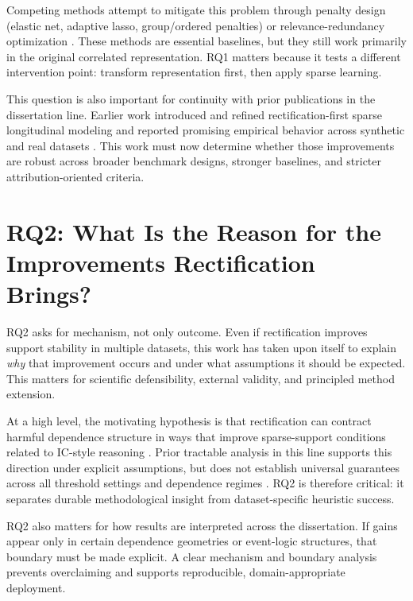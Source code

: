 Competing methods attempt to mitigate this problem through penalty design (elastic net, adaptive lasso, group/ordered penalties) or relevance-redundancy optimization \autocites{HZou2005Regularization,HZou2006adaptive,yuan2006,meier2008,RTibshirani2016ordered,katrutsa2017}. These methods are essential baselines, but they still work primarily in the original correlated representation. RQ1 matters because it tests a different intervention point: transform representation first, then apply sparse learning.

This question is also important for continuity with prior publications in the dissertation line. Earlier work introduced and refined rectification-first sparse longitudinal modeling and reported promising empirical behavior across synthetic and real datasets \autocites{orender2022,JOrender2025Efficient}. This work must now determine whether those improvements are robust across broader benchmark designs, stronger baselines, and stricter attribution-oriented criteria.

\section{RQ2: What Is the Reason for the Improvements Rectification Brings?}

RQ2 asks for mechanism, not only outcome. Even if rectification improves support stability in multiple datasets, this work has taken upon itself to explain \emph{why} that improvement occurs and under what assumptions it should be expected. This matters for scientific defensibility, external validity, and principled method extension.

At a high level, the motivating hypothesis is that rectification can contract harmful dependence structure in ways that improve sparse-support conditions related to IC-style reasoning \autocites{PZhao2006model,RAHorn2012Matrix}. Prior tractable analysis in this line supports this direction under explicit assumptions, but does not establish universal guarantees across all threshold settings and dependence regimes \autocite{JOrender2025Efficient}. RQ2 is therefore critical: it separates durable methodological insight from dataset-specific heuristic success.

RQ2 also matters for how results are interpreted across the dissertation. If gains appear only in certain dependence geometries or event-logic structures, that boundary must be made explicit. A clear mechanism and boundary analysis prevents overclaiming and supports reproducible, domain-appropriate deployment.

